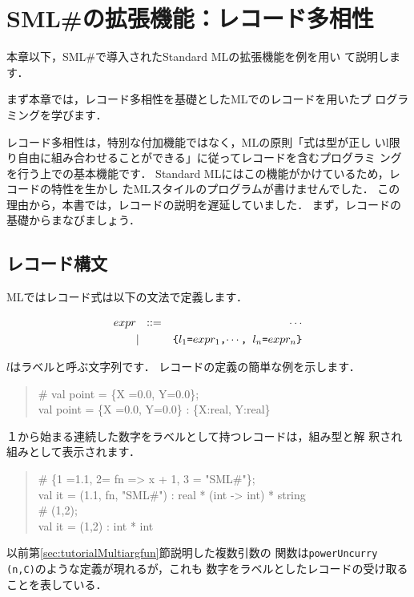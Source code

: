 \documentclass{jbook}
\newcommand{\smlsharp}{SML\#}
\begin{document}
\chapter{\smlsharp{}の拡張機能：レコード多相性}
\label{chap:tutorialRecordpolymorphism}

	本章以下，\smlsharp{}で導入されたStandard MLの拡張機能を例を用い
て説明します．

	まず本章では，レコード多相性を基礎としたMLでのレコードを用いたプ
ログラミングを学びます．

	レコード多相性は，特別な付加機能ではなく，MLの原則「式は型が正し
いl限り自由に組み合わせることができる」に従ってレコードを含むプログラミ
ングを行う上での基本機能です．
	Standard MLにはこの機能がかけているため，レコードの特性を生かし
たMLスタイルのプログラムが書けませんでした．
	この理由から，本書では，レコードの説明を遅延していました．
	まず，レコードの基礎からまなびましょう．

\section{レコード構文}
\label{sec:extensionRecordExpression}

	MLではレコード式は以下の文法で定義します．
\begin{tt}
\begin{eqnarray*}
expr &\mbox{\ \ }::=& \cdots \\
     &|& \mbox{\tt \{$l_1$=$expr_1$,$\cdots$, $l_n$=$expr_n$\}}
\end{eqnarray*}
\end{tt}
	$l$はラベルと呼ぶ文字列です．
	レコードの定義の簡単な例を示します．
\begin{tt}
\begin{quote}
\# val point = \{X =0.0, Y=0.0\};\\
val point = \{X =0.0, Y=0.0\} : \{X:real, Y:real\}
\end{quote}
\end{tt}
	１から始まる連続した数字をラベルとして持つレコードは，組み型と解
釈され組みとして表示されます．
\begin{tt}
\begin{quote}
\#  \{1 =1.1, 2= fn => x + 1, 3 = "SML\#"\};\\
val it = (1.1, fn, "SML\#") : real * (int -> int) * string\\
\# (1,2);\\
val it = (1,2) : int * int
\end{quote}
\end{tt}
	以前第\ref{sec:tutorialMultiargfun}節説明した複数引数の
関数は{\tt powerUncurry (n,C)}のような定義が現れるが，これも
数字をラベルとしたレコードの受け取ることを表している．
\end{document}
